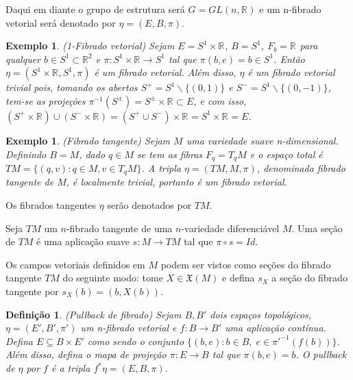 \documentclass[12pt]{book}
\newtheorem{definicao}[teorema]{Definição}
\newtheorem{exemplo}[teorema]{Exemplo}
\newcommand{\campossuaves}[1]{\mathfrak{X}(#1)}
\newcommand{\real}[1]{\mathbb{R}^{#1}}
\begin{document}
	Daqui em diante o grupo de estrutura será $G = GL(n,\real{})$ e um n-fibrado vetorial será denotado por $\eta = (E,B,\pi)$.
	
	\begin{exemplo}
		(1-Fibrado vetorial) Sejam $E=S^{1} \times \real{}$, $B=S^{1}$, $F_{b} = \real{}$ para qualquer $b \in S^{1}\subset \real{2}$ e $\pi:S^{1} \times \real{}\to S^{1}$ tal que $\pi(b, e)=b \in S^{1}$. Então $\eta=(S^{1} \times \real{}, S^{1}, \pi)$ é um fibrado vetorial. Além disso, $\eta$ é um fibrado vetorial trivial pois, tomando os abertos $S^{+} = S^{1} \backslash \{(0,1)\}$ e $S^{-} = S^{1} \backslash \{(0,-1)\}$, tem-se as projeções $\pi^{-1}(S^{\pm}) = S^{\pm} \times \real{} \subset E$, e com isso, $(S^{+}\times\real{}) \cup ( S^{-}\times\real{}) = (S^{+}\cup S^{-})\times\real{} = S^{1} \times\real{} =E$.
	\end{exemplo}
	
	\begin{exemplo}
		(Fibrado tangente) Sejam $M$ uma variedade suave n-dimensional. Definindo $B=M$, dado $q\in M$ se tem as fibras $F_{q} = T_{q}M$ e o espaço total é $TM=\{(q, v): q\in M, v\in T_{q}M \}$. A tripla $\eta = (TM, M, \pi)$, denominada fibrado tangente de $M$, é localmente trivial, portanto é um fibrado vetorial.
	\end{exemplo}

	Os fibrados tangentes $\eta$ serão denotados por $TM$.
 
 	Seja $TM$ um $n$-fibrado tangente de uma $n$-variedade diferenciável $M$. Uma seção de $TM$ é uma aplicação suave $s:M \to TM$ tal que $\pi\circ s=Id$.
	
	Os campos vetoriais definidos em $M$ podem ser vistos como seções do fibrado tangente $TM$ do seguinte modo: tome $X\in \campossuaves{M}$ e defina $s_{X}$ a seção do fibrado tangente por $s_{X}(b) = (b, X(b))$.
	
	\begin{definicao}
		(Pullback de fibrado) Sejam $B, B'$ dois espaços topológicos, $\eta=(E', B', \pi')$ um n-fibrado vetorial e $f:B\to B'$ uma aplicação contínua. Defina $E \subseteq B\times E'$ como sendo o conjunto $\{(b, e): b \in B,\; e \in \pi'^{-1}(f(b)) \}$. Além disso, defina o mapa de projeção $\pi:E\to B$ tal que $\pi(b,e) = b$. O pullback de $\eta$ por $f$ é a tripla $f^{*}\eta = (E,B, \pi)$.
	\end{definicao}
	
\end{document}
